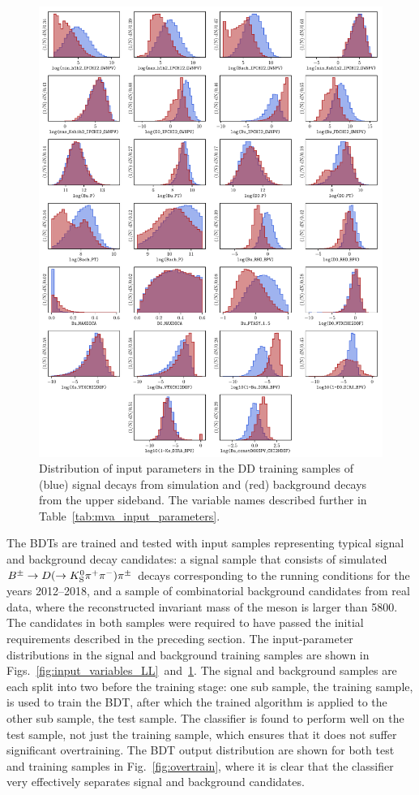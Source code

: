 \begin{figure}[p!]
    \centering
    \includegraphics[width=0.95\columnwidth]{figures/analysis/input_param_DD.pdf}
    \caption{Distribution of input parameters in the DD training samples of (blue) signal decays from simulation and (red) background decays from the upper \B sideband. The variable names described further in Table~\ref{tab:mva_input_parameters}.}
    \label{fig:input_variables_DD}
\end{figure}


The BDTs are trained and tested with input samples representing typical signal and background decay candidates: a signal sample that consists of simulated ${{B}^\pm}\rightarrow{\ensuremath{D}}(\rightarrow{\ensuremath{{K}^0_{\mathrm{S}}}}{\ensuremath{{\pi}^+}}{\ensuremath{{\pi}^-}}){{\pi}^\pm}$ decays corresponding to the \lhcb running conditions for the years 2012--2018, and a sample of combinatorial background candidates from real data, where the reconstructed invariant mass of the \B meson is larger than 5800\mevcc. The candidates in both samples were required to have passed the initial requirements described in the preceding section. The input-parameter distributions in the signal and background training samples are shown in Figs.~\ref{fig:input_variables_LL}~and~\ref{fig:input_variables_DD}. The signal and background samples are each split into two before the training stage: one sub sample, the training sample, is used to train the BDT, after which the trained algorithm is applied to the other sub sample, the test sample. The classifier is found to perform well on the test sample, not just the training sample, which ensures that it does not suffer significant overtraining. The BDT output distribution are shown for both test and training samples in Fig.~\ref{fig:overtrain}, where it is clear that the classifier very effectively separates signal and background candidates.

